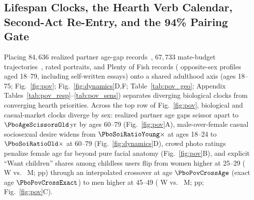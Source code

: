 \subsection{Lifespan Clocks, the Hearth Verb Calendar, Second-Act Re-Entry, and the 94\% Pairing Gate}
Placing $84{,}636$ realized partner age-gap records~\cite{kowal2025,walter2020}, $67{,}733$ mate-budget trajectories~\cite{kowal2025}, \PboHonEligible{} rated portraits, and \PboPovRows{} Plenty of Fish records (\PboPovEligible{} opposite-sex profiles aged 18--79, including \PboVoiceEssaysN{} self-written essays) onto a shared adulthood axis (ages 18--75; Fig.~\ref{fig:pov}; Fig.~\ref{fig:dynamics}D,F; Table~\ref{tab:pov_geo}; Appendix Tables~\ref{tab:pov_resp}--\ref{tab:pov_sens}) separates diverging biological clocks from converging hearth priorities. Across the top row of Fig.~\ref{fig:pov}, biological and casual-market clocks diverge by sex: realized partner age gaps scissor apart to $\PboAgeScissorsOld\,\mathrm{yr}$ by ages 60--79 (Fig.~\ref{fig:pov}A), male-over-female casual sociosexual desire widens from $\PboSoiRatioYoung\times$ at ages 18--24 to $\PboSoiRatioOld\times$ at 60--79 (Fig.~\ref{fig:dynamics}D), crowd photo ratings penalize female age far beyond pure facial anatomy (Fig.~\ref{fig:pov}B), and explicit ``Want children'' shares among childless users flip from women higher at 25--29 (\PboPovWantYoungW{} W vs.\ \PboPovWantYoungM{} M; \PboPovGapYoung{} pp) through an interpolated crossover at age $\PboPovCrossAge$ (exact age $\PboPovCrossExact$) to men higher at 45--49 (\PboPovWantOlderW{} W vs.\ \PboPovWantOlderM{} M; \PboPovGapOlder{} pp; Fig.~\ref{fig:pov}C).

